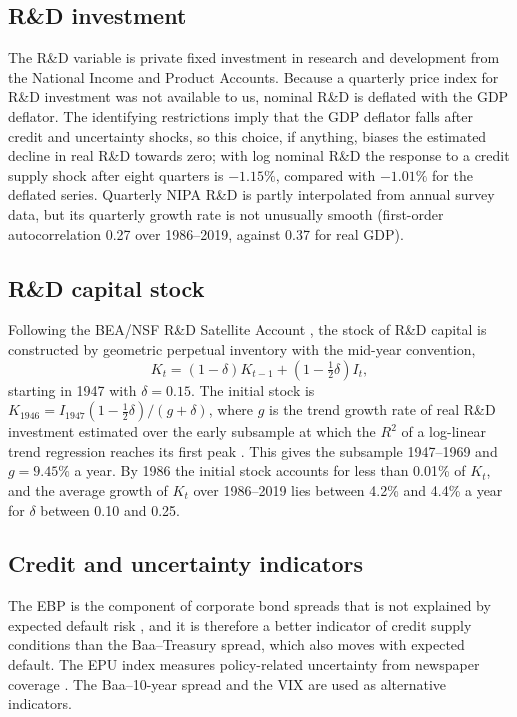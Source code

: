 \documentclass[conference]{IEEEtran}
\begin{document}
\subsection{R\&D investment}
The R\&D variable is private fixed investment in research and development
from the National Income and Product Accounts. Because a quarterly price index
for R\&D investment was not available to us, nominal R\&D is deflated with the
GDP deflator. The identifying restrictions imply that the GDP deflator falls
after credit and uncertainty shocks, so this choice, if anything, biases the
estimated decline in real R\&D towards zero; with log nominal R\&D the
response to a credit supply shock after eight quarters is $-1.15\%$, compared
with $-1.01\%$ for the deflated series. Quarterly NIPA R\&D is partly
interpolated from annual survey data, but its quarterly growth rate is not
unusually smooth (first-order autocorrelation 0.27 over 1986--2019, against
0.37 for real GDP).

\subsection{R\&D capital stock}
Following the BEA/NSF R\&D Satellite Account \cite{sliker2007}, the stock of
R\&D capital is constructed by geometric perpetual inventory with the
mid-year convention,
\begin{equation}
K_t=(1-\delta)K_{t-1}+\left(1-\tfrac{1}{2}\delta\right)I_t ,
\label{eq:pim}
\end{equation}
starting in 1947 with $\delta=0.15$. The initial stock is
$K_{1946}=I_{1947}(1-\frac{1}{2}\delta)/(g+\delta)$, where $g$ is the trend
growth rate of real R\&D investment estimated over the early subsample at which
the $R^2$ of a log-linear trend regression reaches its first peak
\cite{sliker2007}. This gives the subsample 1947--1969 and $g=9.45\%$ a year.
By 1986 the initial stock accounts for less than 0.01\% of $K_t$, and the
average growth of $K_t$ over 1986--2019 lies between 4.2\% and 4.4\% a year for
$\delta$ between 0.10 and 0.25.

\subsection{Credit and uncertainty indicators}
The EBP is the component of corporate bond spreads that is not explained by
expected default risk \cite{gilchrist2012}, and it is therefore a better
indicator of credit supply conditions than the Baa--Treasury spread, which also
moves with expected default. The EPU index measures policy-related
uncertainty from newspaper coverage \cite{baker2016}. The Baa--10-year spread
and the VIX are used as alternative indicators.
\end{document}

